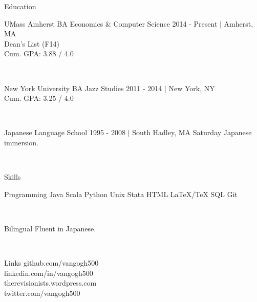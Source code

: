 \documentclass {vangogh500-resume}
\begin{document}
\begin {minipage} [t] {0.33\textwidth}
	\begin {newcategory} {Education}
		\begin{school} {UMass Amherst} {BA Economics \& Computer Science}
			2014 - Present $|$ Amherst, MA \\
			Dean's List (F14) \\
			Cum. GPA: 3.88 / 4.0 
		\end{school}
		\\[15pt]
		\begin{school} {New York University} {BA Jazz Studies}
			2011 - 2014 $|$ New York, NY \\
			Cum. GPA: 3.25 / 4.0
		\end{school}
		\\[15pt]
		\begin {newsubcategory} {Japanese Language School}
			1995 - 2008 $|$ South Hadley, MA
			Saturday Japanese immersion.
		\end {newsubcategory}
	\end {newcategory}
	\\[15pt]
	\begin {newcategory} {Skills}
		\begin {newsubcategory} {Programming}
			Java \textbullet{} Scala \textbullet{} Python \textbullet{} Unix \textbullet{} Stata \textbullet{} HTML
			\textbullet{} LaTeX/TeX \textbullet{} SQL \textbullet{} Git 
		\end {newsubcategory}
		\\[15pt]
		\begin {newsubcategory} {Bilingual}
			Fluent in Japanese.
		\end {newsubcategory}
	\end {newcategory}
	\\[15pt]
	\begin {newcategory} {Links}
		 {github.com/vangogh500} 
		\\[3pt]
		 {linkedin.com/in/vangogh500}
		\\[3pt]
		 {therevisionists.wordpress.com}
		\\[3pt]
		 {twitter.com/vangogh500}
	\end {newcategory}
	\\[15pt]
\end {minipage}%
\begin{minipage}[t]{0.02\textwidth}
\hfill
\end {minipage}%
\end{document}
